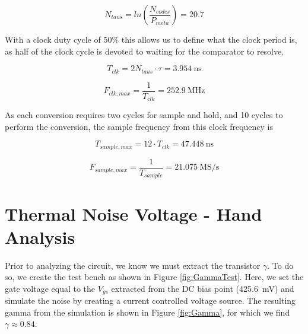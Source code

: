 \documentclass[letterpaper, notitlepage]{revtex4-1}
\begin{document}
  \begin{equation}
    N_{taus} = ln\left(\frac{N_{codes}}{P_{meta}}\right) = 20.7
  \end{equation}

  With a clock duty cycle of 50\% this allows us to define what the clock
  period is, as half of the clock cycle is devoted to waiting for the
  comparator to resolve.

  \begin{equation}
    T_{clk} = 2 N_{taus} \cdot \tau = \SI{3.954}{\nano\second}
  \end{equation}

  \begin{equation}
    F_{clk,max} = \frac{1}{T_{clk}} = \SI{252.9}{\mega\hertz}
  \end{equation}

  As each conversion requires two cycles for sample and hold, and 10 cycles
  to perform the conversion, the sample frequency from this clock frequency is

  \begin{equation}
      T_{sample,max} = 12 \cdot T_{clk} = \SI{47.448}{\nano\second}
  \end{equation}

  \begin{equation}
    F_{sample,max} = \frac{1}{T_{sample}} = \SI{21.075}{\mega\siemens\per\second}  %
  \end{equation}

\section{Thermal Noise Voltage - Hand Analysis}
Prior to analyzing the circuit, we know we must extract the transistor $\gamma$. To do so, we create the test bench as shown in Figure \ref{fig:GammaTest}. Here, we set the gate voltage equal to the $V_{gs}$ extracted from the DC bias point (\SI{425.6}{\milli\volt}) and simulate the noise by creating a current controlled voltage source. The resulting gamma from the simulation is shown in Figure \ref{fig:Gamma}, for which we find $\gamma\approx0.84$.
\end{document}
